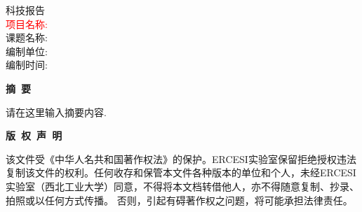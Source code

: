 \documentclass[12pt,a4paper]{article}
\begin{document}
\renewcommand{\contentsname}{\ \ \ 目录\ \ \ }
\renewcommand{\appendixname}{附录}
\renewcommand{\appendixpagename}{附录}
\renewcommand{\refname}{参考文献} 
\renewcommand{\figurename}{图}
\renewcommand{\tablename}{表}
\renewcommand{\today}{\number\year 年 \number\month 月 \number\day 日}
\songti %

\renewcommand{\maketitle}{
    \thispagestyle{title}
    \vspace*{94pt}
    \begin{center}
        \fontsize{50pt}{0} 科技报告\\
        \vspace*{300pt}
        \large \textcolor{red}{项目名称: \quad}\ \ \underline{\makebox[300pt]{待填写}}\\
        \large 课题名称: \quad\ \ \underline{\makebox[300pt]{待填写}}\\
        \large 编制单位: \quad\ \ \underline{\makebox[300pt]{待填写}}\\
        \large 编制时间: \quad\ \ \underline{\makebox[300pt]{\today}}

    \end{center}
}

\maketitle


\songti %
\newpage

\begin{center}
{\Large\bf{摘\ 要\\}}
\end{center}
请在这里输入摘要内容.
\newpage
\begin{center}
{\Large\bf{版\ 权\ 声\ 明\\}}
\end{center}
该文件受《中华人名共和国著作权法》的保护。ERCESI实验室保留拒绝授权违法复制该文件的权利。任何收存和保管本文件各种版本的单位和个人，未经ERCESI实验室（西北工业大学）同意，不得将本文档转借他人，亦不得随意复制、抄录、拍照或以任何方式传播。 否则，引起有碍著作权之问题，将可能承担法律责任。\newpage
\begin{center}
\tableofcontents\label{c}
\end{center}
\newpage
\end{document}
